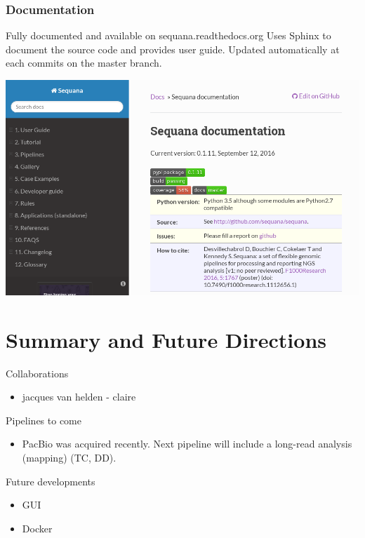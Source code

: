 \documentclass{beamer}
\begin{document}
\begin{frame}[fragile]
    \frametitle{Documentation}
    Fully documented and available on sequana.readthedocs.org
    Uses Sphinx to document the source code and provides user guide.
    Updated automatically at each commits on the master branch.
\begin{center}
\includegraphics[scale=0.3]{images/rtd}
\end{center}
\end{frame}




\section{Summary and Future Directions}
\begin{frame}

\begin{block}{Collaborations}
\begin{itemize}
 \item jacques van helden - claire
\end{itemize}
\end{block}

\begin{block}{Pipelines to come}
\begin{itemize}
 \item PacBio was acquired recently. Next pipeline will include
 a long-read analysis (mapping) (TC, DD). 
\end{itemize}
\end{block}

\begin{block}{Future developments}
 \begin{itemize}
  \item GUI 
  \item Docker
 \end{itemize}
\end{block}
 \end{frame}
\end{document}
